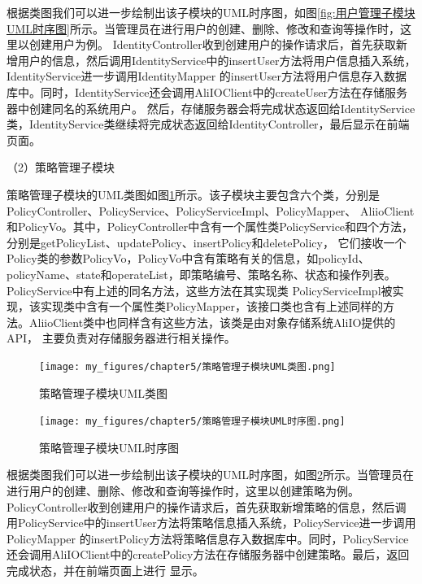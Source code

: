 根据类图我们可以进一步绘制出该子模块的UML时序图，如图\ref{fig:用户管理子模块UML时序图}所示。当管理员在进行用户的创建、删除、修改和查询等操作时，这里以创建用户为例。
IdentityController收到创建用户的操作请求后，首先获取新增用户的信息，然后调用IdentityService中的insertUser方法将用户信息插入系统，IdentityService进一步调用IdentityMapper
的insertUser方法将用户信息存入数据库中。同时，IdentityService还会调用AliIOClient中的createUser方法在存储服务器中创建同名的系统用户。
然后，存储服务器会将完成状态返回给IdentityService类，IdentityService类继续将完成状态返回给IdentityController，最后显示在前端页面。


（2）策略管理子模块



策略管理子模块的UML类图如图\ref{fig:策略管理子模块UML类图}所示。该子模块主要包含六个类，分别是PolicyController、PolicyService、PolicyServiceImpl、PolicyMapper、 
AliioClient和PolicyVo。其中，PolicyController中含有一个属性类PolicyService和四个方法，分别是getPolicyList、updatePolicy、insertPolicy和deletePolicy，
它们接收一个Policy类的参数PolicyVo，PolicyVo中含有策略有关的信息，如policyId、policyName、state和operateList，即策略编号、策略名称、状态和操作列表。
PolicyService中有上述的同名方法，这些方法在其实现类
PolicyServiceImpl被实现，该实现类中含有一个属性类PolicyMapper，该接口类也含有上述同样的方法。AliioClient类中也同样含有这些方法，该类是由对象存储系统AliIO提供的API，
主要负责对存储服务器进行相关操作。

\begin{figure}[htb]
    \centering
    \texttt{[image: my\_figures/chapter5/策略管理子模块UML类图.png]}
    \caption{策略管理子模块UML类图}
    \label{fig:策略管理子模块UML类图}
\end{figure}

\begin{figure}[htb]
    \centering
    \texttt{[image: my\_figures/chapter5/策略管理子模块UML时序图.png]}
    \caption{策略管理子模块UML时序图}
    \label{fig:策略管理子模块UML时序图}
\end{figure}

根据类图我们可以进一步绘制出该子模块的UML时序图，如图\ref{fig:策略管理子模块UML时序图}所示。当管理员在进行用户的创建、删除、修改和查询等操作时，这里以创建策略为例。
PolicyController收到创建用户的操作请求后，首先获取新增策略的信息，然后调用PolicyService中的insertUser方法将策略信息插入系统，PolicyService进一步调用PolicyMapper
的insertPolicy方法将策略信息存入数据库中。同时，PolicyService还会调用AliIOClient中的createPolicy方法在存储服务器中创建策略。最后，返回完成状态，并在前端页面上进行
显示。

